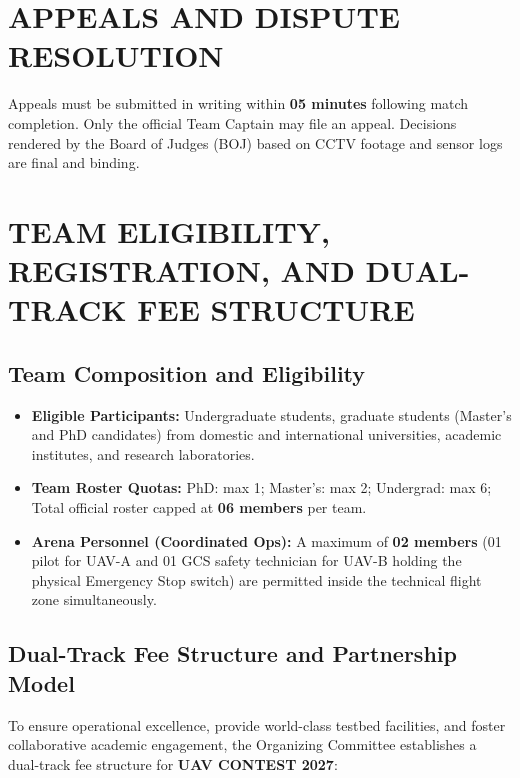\documentclass[12pt,a4paper]{article}
\begin{document}
\section{APPEALS AND DISPUTE RESOLUTION}

Appeals must be submitted in writing within \textbf{05 minutes} following match completion. Only the official Team Captain may file an appeal. Decisions rendered by the Board of Judges (BOJ) based on CCTV footage and sensor logs are final and binding.

\section{TEAM ELIGIBILITY, REGISTRATION, AND DUAL-TRACK FEE STRUCTURE}

\subsection{Team Composition and Eligibility}
\begin{itemize}
\item \textbf{Eligible Participants:} Undergraduate students, graduate students (Master's and PhD candidates) from domestic and international universities, academic institutes, and research laboratories.
\item \textbf{Team Roster Quotas:} PhD: max 1; Master's: max 2; Undergrad: max 6; Total official roster capped at \textbf{06 members} per team.
\item \textbf{Arena Personnel (Coordinated Ops):} A maximum of \textbf{02 members} (01 pilot for UAV-A and 01 GCS safety technician for UAV-B holding the physical Emergency Stop switch) are permitted inside the technical flight zone simultaneously.
\end{itemize}

\subsection{Dual-Track Fee Structure and Partnership Model}
To ensure operational excellence, provide world-class testbed facilities, and foster collaborative academic engagement, the Organizing Committee establishes a dual-track fee structure for \textbf{UAV CONTEST 2027}:
\end{document}
